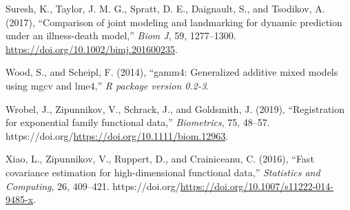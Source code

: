 \documentclass[
  11pt,
]{article}
\newlength{\cslhangindent}
\newlength{\cslentryspacingunit} %
\newenvironment{CSLReferences}[2] %
 {%
  \setlength{\parindent}{0pt}
  \ifodd #1
  \let\oldpar\par
  \def\par{\hangindent=\cslhangindent\oldpar}
  \fi
  \setlength{\parskip}{#2\cslentryspacingunit}
 }%
 {}
\begin{document}
\begin{CSLReferences}{1}{0}
\leavevmode{}%
Suresh, K., Taylor, J. M. G., Spratt, D. E., Daignault, S., and
Tsodikov, A. (2017), {``Comparison of joint modeling and landmarking for
dynamic prediction under an illness-death model,''} \emph{Biom J}, 59,
1277--1300. \url{https://doi.org/10.1002/bimj.201600235}.

\leavevmode{}%
Wood, S., and Scheipl, F. (2014), {``gamm4: Generalized additive mixed
models using mgcv and lme4,''} \emph{R package version 0.2-3}.

\leavevmode{}%
Wrobel, J., Zipunnikov, V., Schrack, J., and Goldsmith, J. (2019),
{``Registration for exponential family functional data,''}
\emph{Biometrics}, 75, 48--57.
https://doi.org/\url{https://doi.org/10.1111/biom.12963}.

\leavevmode{}%
Xiao, L., Zipunnikov, V., Ruppert, D., and Crainiceanu, C. (2016),
{``Fast covariance estimation for high-dimensional functional data,''}
\emph{Statistics and Computing}, 26, 409--421.
https://doi.org/\url{https://doi.org/10.1007/s11222-014-9485-x}.

\end{CSLReferences}
\end{document}
